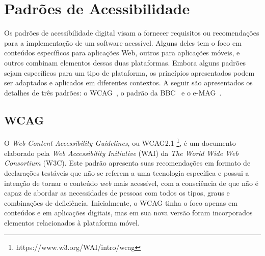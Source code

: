 
\section{Padrões de Acessibilidade}

Os padrões de acessibilidade digital visam a fornecer requisitos ou recomendações para a implementação de um software acessível. Alguns deles tem o foco em conteúdos específicos para aplicações Web, outros para aplicações móveis, e outros combinam elementos dessas duas plataformas. Embora alguns padrões sejam específicos para um tipo de plataforma, os princípios apresentados podem ser adaptados e aplicados em diferentes contextos. 
A seguir são apresentados os detalhes de três padrões: o WCAG~\cite{wcag}, o padrão da BBC~\cite{bbc} e o e-MAG~\cite{emag}. 


\subsection{WCAG}

O \textit{Web Content Accessibility Guidelines}, ou WCAG2.1 \footnote{https://www.w3.org/WAI/intro/wcag}, é um documento elaborado pela \textit{Web Accessibility Initiative} (WAI) da \textit{The World Wide Web Consortium} (W3C). 
Este padrão apresenta suas recomendações em formato de declarações testáveis que não se referem a uma tecnologia específica e possui a intenção de tornar o conteúdo \textit{web} mais acessível, com a consciência de que não é capaz de abordar as necessidades de pessoas com todos os tipos, graus e combinações de deficiência.
Inicialmente, o WCAG tinha o foco apenas em conteúdos e em aplicações digitais, mas em sua nova versão foram incorporados elementos relacionados à plataforma móvel.


